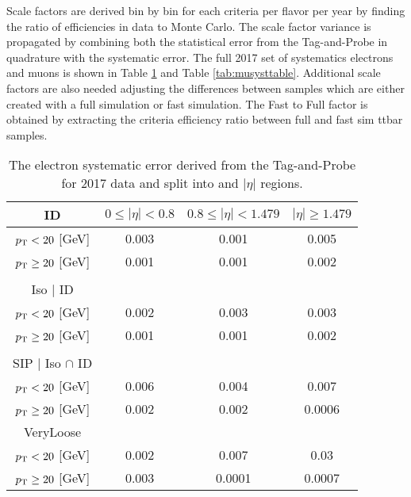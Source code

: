 Scale factors are derived bin by bin for each criteria per flavor per year by finding the ratio of efficiencies in data to Monte Carlo. The scale factor variance is propagated by combining both the statistical error from the Tag-and-Probe in quadrature with the systematic error. The full 2017 set of systematics electrons and muons is shown in Table \ref{tab:elesysts} and Table \ref{tab:musysttable}. Additional scale factors are also  needed adjusting the differences between samples which are either created with a full simulation or fast simulation. The Fast to Full factor is obtained by extracting the criteria efficiency ratio between  full and fast sim ttbar samples.

	
\begin{table}
\caption{The electron systematic error derived from the Tag-and-Probe for 2017 data and split into \pt and $|\eta|$ regions. }
\label{tab:elesysts}
\begin{tabular}{|c|ccc|}
\hline
ID & $0\leq |\eta|<0.8$ & $0.8\leq |\eta|<1.479$ & $|\eta|\geq1.479$ \\
\hline
$p_{\mathrm{T}} < 20$ [GeV] & 0.003 & 0.001 & 0.005 \\
$p_{\mathrm{T}} \geq 20$ [GeV] & 0.001 & 0.001 & 0.002  \\
 &  &  &    \\
\hline
Iso $|$ ID  &  &  &   \\
\hline
$p_{\mathrm{T}} < 20$ [GeV] & 0.002 & 0.003 & 0.003   \\
$p_{\mathrm{T}} \geq 20$ [GeV] & 0.001 & 0.001 & 0.002 \\
 &  &  &   \\
\hline
SIP $|$ Iso $\cap$ ID &  &  &  \\
\hline
$p_{\mathrm{T}} < 20$ [GeV]& 0.006 & 0.004 & 0.007 \\
$p_{\mathrm{T}} \geq 20$ [GeV]& 0.002 & 0.002 & 0.0006  \\
\hline
VeryLoose &  &  &  \\
\hline
$p_{\mathrm{T}} < 20$ [GeV]& 0.002 & 0.007 & 0.03 \\
$p_{\mathrm{T}} \geq 20$ [GeV]& 0.003 & 0.0001 & 0.0007 \\
\hline
\end{tabular}
\end{table}


